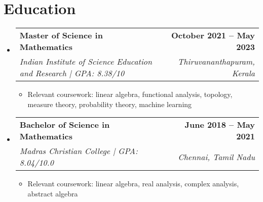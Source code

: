 \documentclass[letterpaper,11pt]{article}
\makeatletter
\newcommand{\resumeItem}[1]{
  \item\small{
    {#1 \vspace{-2pt}}
  }
}
\newcommand{\resumeSubheading}[4]{
  \vspace{-2pt}\item
    \begin{tabular*}{1.0\textwidth}[t]{l@{\extracolsep{\fill}}r}
      \textbf{#1} & \textbf{\small #2} \\
      \textit{\small#3} & \textit{\small #4} \\
    \end{tabular*}\vspace{-7pt}
}
\newcommand{\resumeSubHeadingListStart}{\begin{itemize}[leftmargin=0.0in, label={}]}
\newcommand{\resumeSubHeadingListEnd}{\end{itemize}}
\newcommand{\resumeItemListStart}{\begin{itemize}}
\newcommand{\resumeItemListEnd}{\end{itemize}\vspace{-4pt}}
\makeatother
\begin{document}
\section{Education}
  \resumeSubHeadingListStart
    \resumeSubheading
      {Master of Science in Mathematics}{October 2021 -- May 2023}
      {Indian Institute of Science Education and Research | GPA: 8.38/10}{Thiruvananthapuram, Kerala}
      \resumeItemListStart
      \resumeItem{Relevant coursework: linear algebra, functional analysis, topology, measure theory, probability theory, machine learning}
      \resumeItemListEnd
  \resumeSubHeadingListEnd
  \vspace{-12pt}
  \resumeSubHeadingListStart
    \resumeSubheading
      {Bachelor of Science in Mathematics}{June 2018 -- May 2021}
      {Madras Christian College | GPA: 8.04/10.0}{Chennai, Tamil Nadu}
      \resumeItemListStart
      \resumeItem{Relevant coursework: linear algebra, real analysis, complex analysis, abstract algebra}
      \resumeItemListEnd
  \resumeSubHeadingListEnd
  \vspace{-8pt}

%


\end{document}
